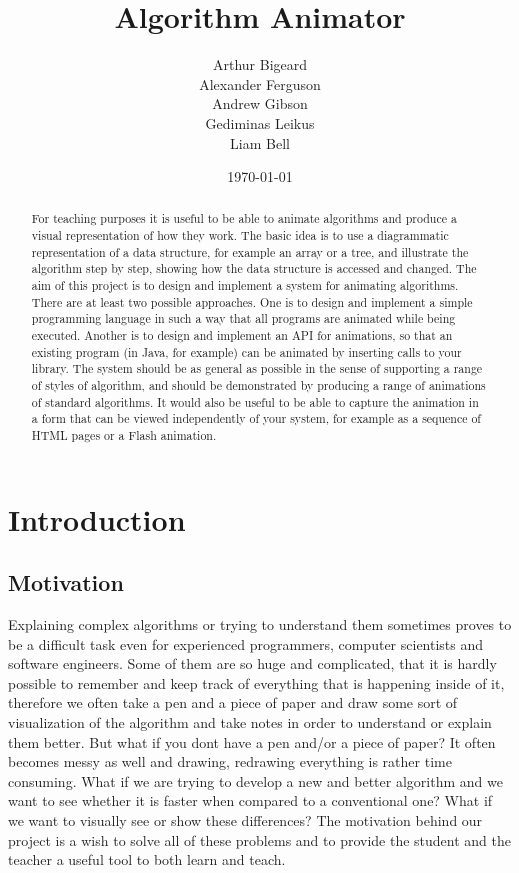 \documentclass{l3proj}
\begin{document}
\title{Algorithm Animator}
\author{Arthur Bigeard \\
		Alexander Ferguson \\
		Andrew Gibson \\
		Gediminas Leikus \\
		Liam Bell}
\usdate
\date{\today}
\maketitle
\begin{abstract}


For teaching purposes it is useful to be able to animate algorithms and produce a visual representation of how they work. The basic idea is to use a diagrammatic representation of a data structure, for example an array or a tree, and illustrate the algorithm step by step, showing how the data structure is accessed and changed. The aim of this project is to design and implement a system for animating algorithms. There are at least two possible approaches. One is to design and implement a simple programming language in such a way that all programs are animated while being executed. Another is to design and implement an API for animations, so that an existing program (in Java, for example) can be animated by inserting calls to your library. The system should be as general as possible in the sense of supporting a range of styles of algorithm, and should be demonstrated by producing a range of animations of standard algorithms. It would also be useful to be able to 
capture the animation in a form that can be viewed independently of your system, for example as a sequence of HTML pages or a Flash animation.

\end{abstract}
\educationalconsent
\tableofcontents
\chapter{Introduction}
\label{intro}

\section{Motivation}
Explaining complex algorithms or trying to understand them sometimes proves to be a difficult task even for experienced programmers, computer scientists and software engineers. Some of them are so huge and complicated, that it is hardly possible to remember and keep track of everything that is happening inside of it, therefore we often take a pen and a piece of paper and draw some sort of visualization of the algorithm and take notes in order to understand or explain them better. But what if you dont have a pen and/or a piece of paper? It often becomes messy as well and drawing, redrawing everything is rather time consuming. What if we are trying to develop a new and better algorithm and we want to see whether it is faster when compared to a conventional one? What if we want to visually see or show these differences? The motivation behind our project is a wish to solve all of these problems and to provide the student and the teacher a useful tool to both learn and teach. 
\end{document}
